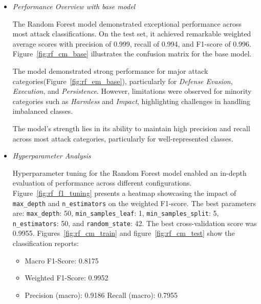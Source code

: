             \begin{itemize}
        
                \item \textit{Performance Overview with base model}
                
                    \vspace{0.3em}

                    The Random Forest model demonstrated exceptional performance across most attack classifications. On the test set, it achieved remarkable weighted average scores with precision of 0.999, recall of 0.994, and F1-score of 0.996. Figure~\ref{fig:rf_cm_base} illustrates the confusion matrix for the base model.
            
                    The model demonstrated strong performance for major attack categories(Figure~\ref{fig:rf_em_base}), particularly for \textit{Defense Evasion}, \textit{Execution}, and \textit{Persistence}. However, limitations were observed for minority categories such as \textit{Harmless} and \textit{Impact}, highlighting challenges in handling imbalanced classes.
            
                    The model's strength lies in its ability to maintain high precision and recall across most attack categories, particularly for well-represented classes. 

                \vspace{0.5em}

                \item \textit{Hyperparameter Analysis}
                
                    \vspace{0.3em}
                    
                    Hyperparameter tuning for the Random Forest model enabled an in-depth evaluation of performance across different configurations. Figure~\ref{fig:rf_f1_tuning} presents a heatmap showcasing the impact of \texttt{max\_depth} and \texttt{n\_estimators} on the weighted F1-score. The best parameters are: \texttt{max\_depth}: 50, \texttt{min\_samples\_leaf}: 1, \texttt{min\_samples\_split}: 5, \texttt{n\_estimators}: 50, and \texttt{random\_state}: 42. The best cross-validation score was 0.9955. Figures~\ref{fig:rf_cm_train} and figure~\ref{fig:rf_cm_test} show the classification reports:

                    \begin{itemize}
                        \item Macro F1-Score: 0.8175
                        \item Weighted F1-Score: 0.9952
                        \item Precision (macro): 0.9186 \quad Recall (macro): 0.7955
                    \end{itemize}


\end{itemize}
